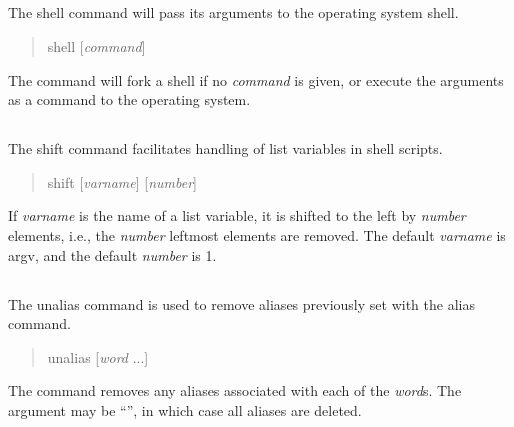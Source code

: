 \subsection{}


The {\cb shell} command will pass its arguments to the operating system
shell.
\begin{quote}\vt
shell [{\it command\/}]
\end{quote}
The command will fork a shell if no {\it command\/} is given, or
execute the arguments as a command to the operating system.

\subsection{}


The {\cb shift} command facilitates handling of list variables in
shell scripts.
\begin{quote}\vt
shift [{\it varname\/}] [{\it number\/}]
\end{quote}
If {\it varname} is the name of a list variable, it is shifted to
the left by {\it number} elements, i.e., the {\it number} leftmost
elements are removed. The default {\it varname} is {\vt argv}, and
the default {\it number} is 1.

\subsection{}


The {\cb unalias} command is used to remove aliases previously set with
the {\cb alias} command.
\begin{quote}\vt
unalias [{\it word} ...]
\end{quote}
The command removes any aliases associated with each of the {\it
word\/}s.  The argument may be ``{\vt *}'', in which case all aliases
are deleted.

\subsection{}


